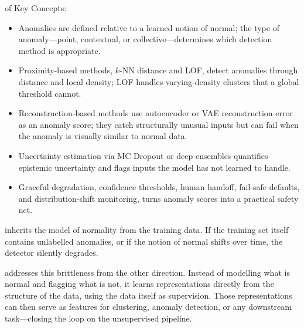  of Key Concepts:
\begin{itemize}
    \item Anomalies are defined relative to a learned notion of normal; the type of anomaly---point, contextual, or collective---determines which detection method is appropriate.
    \item Proximity-based methods, $k$-NN distance and LOF, detect anomalies through distance and local density; LOF handles varying-density clusters that a global threshold cannot.
    \item Reconstruction-based methods use autoencoder or VAE reconstruction error as an anomaly score; they catch structurally unusual inputs but can fail when the anomaly is visually similar to normal data.
    \item Uncertainty estimation via MC Dropout or deep ensembles quantifies epistemic uncertainty and flags inputs the model has not learned to handle.
    \item Graceful degradation, confidence thresholds, human handoff, fail-safe defaults, and distribution-shift monitoring, turns anomaly scores into a practical safety net.
\end{itemize}


 inherits the model of normality from the training data.
If the training set itself contains unlabelled anomalies, or if the notion of normal shifts over time, the detector silently degrades.

 addresses this brittleness from the other direction.
Instead of modelling what is normal and flagging what is not, it learns representations directly from the structure of the data, using the data itself as supervision.
Those representations can then serve as features for clustering, anomaly detection, or any downstream task---closing the loop on the unsupervised pipeline.
